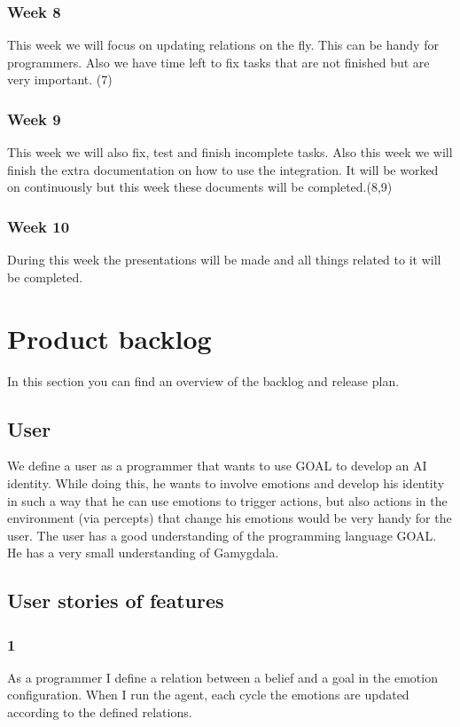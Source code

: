 \documentclass[]{article}
\begin{document}
\subsubsection*{Week 8}
This week we will focus on updating relations on the fly. This can be handy for programmers. Also we have time left to fix tasks that are not finished but are very important. (7)

\subsubsection*{Week 9}
This week we will also fix, test and finish incomplete tasks. Also this week we will finish the extra documentation on how to use the integration. It will be worked on continuously but this week these documents will be completed.(8,9)

\subsubsection*{Week 10}
During this week the presentations will be made and all things related to it will be completed.

\section{Product backlog}
In this section you can find an overview of the backlog and release plan.
\subsection{User}
We define a user as a programmer that wants to use GOAL to develop an AI identity. While doing this, he wants to involve emotions and develop his identity in such a way that he can use emotions to trigger actions, but also actions in the environment (via percepts) that change his emotions would be very handy for the user. The user has a good understanding of the programming language GOAL. He has a very small understanding of Gamygdala.
\subsection{User stories of features}
\subsubsection*{1}
As a programmer I define a relation between a belief and a goal in the emotion configuration. When I run the agent, each cycle the emotions are updated according to the defined relations. 
\end{document}
